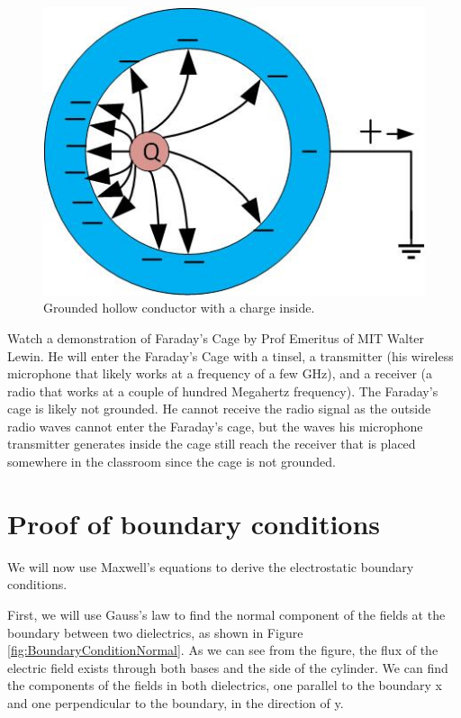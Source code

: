 \documentclass{ximera}
\begin{document}
\begin{figure}[htbp]
\begin{center}
\includegraphics[scale=1]{../jpg/hollowConductorOffsetGrounded.jpg}
\end{center}
\caption{Grounded hollow conductor with a charge inside.}
\label{fig:HollowConductor2}
\end{figure}


 Watch a demonstration of Faraday's Cage by Prof Emeritus of MIT Walter Lewin. He will enter the Faraday's Cage with a tinsel, a transmitter (his wireless microphone that likely works at a frequency of a few GHz), and a receiver (a radio that works at a couple of hundred Megahertz frequency). The Faraday's cage is likely not grounded. He cannot receive the radio signal as the outside radio waves cannot enter the Faraday's cage, but the waves his microphone transmitter generates inside the cage still reach the receiver that is placed somewhere in the classroom since the cage is not grounded. 


\begin{center}  
\end{center}

\section{Proof of boundary conditions}

We will now use Maxwell's equations to derive the electrostatic boundary conditions. 

First, we will use Gauss's law to find the normal component of the fields at the boundary between two dielectrics, as shown in Figure \ref{fig:BoundaryConditionNormal}. As we can see from the figure, the flux of the electric field exists through both bases and the side of the cylinder. We can find the components of the fields in both dielectrics, one parallel to the boundary x and one perpendicular to the boundary, in the direction of y.
\end{document}
